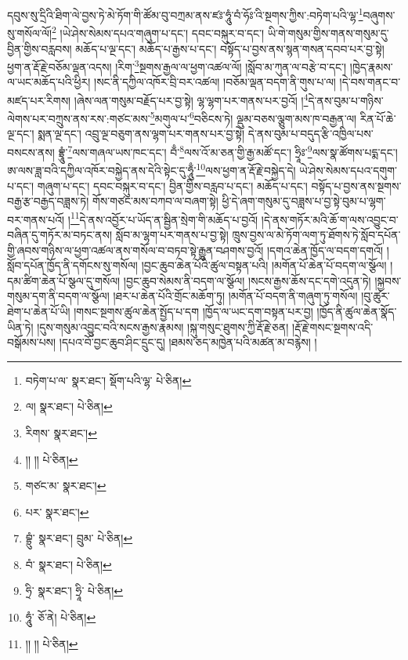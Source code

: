 དབུས་སུ་དྲིའི་ཐིག་ལེ་བྱས་ཏེ་མེ་ཏོག་གི་ཚོམ་བུ་བཀྲམ་ནས་ཛཿ་ཧཱུཾ་བཾ་ཧོཿ་འི་སྔགས་ཀྱིས་:བཏེག་པའི་ལྷ་\footnote{བཏེག་པ་ལ་  སྣར་ཐང་། སྡོག་པའི་ལྷ་  པེ་ཅིན། }བཞུགས་སུ་གསོལ་ལོ།\footnote{ལ།  སྣར་ཐང་།  པེ་ཅིན། } །ཡེ་ཤེས་སེམས་དཔའ་གཞུག་པ་དང་། དབང་བསྐུར་བ་དང་། ཡི་གེ་གསུམ་གྱིས་གནས་གསུམ་དུ་བྱིན་གྱིས་བརླབས། མཆོད་པ་ལྔ་དང་། མཆོད་པ་རྒྱས་པ་དང་། བསྟོད་པ་བྱས་ནས་སྙན་གསན་དབབ་པར་བྱ་སྟེ། ཕྱག་ན་རྡོ་རྗེ་བཅོམ་ལྡན་འདས། །རིག་\footnote{རིགས་  སྣར་ཐང་། }སྔགས་རྒྱལ་ལ་ཕྱག་འཚལ་ལོ། །སློབ་མ་ཀུན་ལ་བརྩེ་བ་དང་། །ཁྱེད་རྣམས་ལ་ཡང་མཆོད་པའི་ཕྱིར། །སང་ནི་དཀྱིལ་འཁོར་བྲི་བར་འཚལ། །བཅོམ་ལྡན་བདག་ནི་གུས་པ་ལ། །དེ་བས་གནང་བ་མཛད་པར་རིགས། །ཞེས་ལན་གསུམ་བརྗོད་པར་བྱ་སྟེ། ལྷ་ལྷག་པར་གནས་པར་བྱའོ། །\footnote{།། །།  པེ་ཅིན། }དེ་ནས་བུམ་པ་གཉིས་ལེགས་པར་བཀྲུས་ནས་རས་:གཙང་མས་\footnote{གཙང་མ་  སྣར་ཐང་། }མགུལ་པ་\footnote{པར་  སྣར་ཐང་། }བཅིངས་ཏེ། ལྡུམ་བཅས་ལྕུག་མས་ཁ་བརྒྱན་ལ། རིན་པོ་ཆེ་ལྔ་དང་། སྨན་ལྔ་དང་། འབྲུ་ལྔ་བཅུག་ནས་ལྷག་པར་གནས་པར་བྱ་སྟེ། དེ་ནས་བུམ་པ་བདུད་རྩི་འཁྱིལ་པས་བསངས་ནས། བྷྲཱུཾ་\footnote{བྷྲུཾ་  སྣར་ཐང་། བྲུམ་  པེ་ཅིན། }ལས་གཞལ་ཡས་ཁང་དང་། བྃ་\footnote{བཾ་  སྣར་ཐང་།  པེ་ཅིན། }ལས་འོ་མ་ཅན་གྱི་རྒྱ་མཚོ་དང་། ཧྲཱིཿ་\footnote{ཧྲི་  སྣར་ཐང་། ཧྲཱི་  པེ་ཅིན། }ལས་སྣ་ཚོགས་པདྨ་དང་། ཨ་ལས་ཟླ་བའི་དཀྱིལ་འཁོར་བསྐྱེད་ནས་དེའི་སྟེང་དུ་ཧཱུྃ་\footnote{ཧཱུཾ་  ཅོ་ནེ།  པེ་ཅིན། }ལས་ཕྱག་ན་རྡོ་རྗེ་བསྐྱེད་དེ། ཡེ་ཤེས་སེམས་དཔའ་དགུག་པ་དང་། གཞུག་པ་དང་། དབང་བསྐུར་བ་དང་། བྱིན་གྱིས་བརླབ་པ་དང་། མཆོད་པ་དང་། བསྟོད་པ་བྱས་ནས་སྔགས་བརྒྱ་རྩ་བརྒྱད་བཟླས་ཏེ། གོས་གཙང་མས་བཀབ་ལ་བཞག་སྟེ། ཕྱི་དེ་ཞག་གསུམ་དུ་བཟླས་པ་བྱ་སྟེ་བུམ་པ་ལྷག་བར་གནས་པའོ། །\footnote{།། །།  པེ་ཅིན། }དེ་ནས་འབྱོར་པ་ཡོད་ན་སྦྱིན་སྲེག་གི་མཆོད་པ་བྱའོ། །དེ་ནས་གཏོར་མའི་ཆོ་ག་ལས་འབྱུང་བ་བཞིན་དུ་གཏོར་མ་བཏང་ནས། སློབ་མ་ལྷག་པར་གནས་པ་བྱ་སྟེ། ཁྲུས་བྱས་ལ་མེ་ཏོག་ལག་ཏུ་ཐོགས་ཏེ་སློབ་དཔོན་གྱི་ཞབས་གཉིས་ལ་ཕྱག་འཚལ་ནས་གསོལ་བ་བཏབ་སྟེ་རྒྱུན་བཤགས་བྱའོ། །དགའ་ཆེན་ཁྱོད་ལ་བདག་དགའོ། །སློབ་དཔོན་ཁྱོད་ནི་དགོངས་སུ་གསོལ། །བྱང་ཆུབ་ཆེན་པོའི་ཚུལ་བསྟན་པའི། །མགོན་པོ་ཆེན་པོ་བདག་ལ་སྩོལ། །དམ་ཚིག་ཆེན་པོ་སྩལ་དུ་གསོལ། །བྱང་ཆུབ་སེམས་ནི་བདག་ལ་སྩོལ། །སངས་རྒྱས་ཆོས་དང་དགེ་འདུན་ཏེ། །སྐྱབས་གསུམ་དག་ནི་བདག་ལ་སྩོལ། །ཐར་པ་ཆེན་པོའི་གྲོང་མཆོག་ཏུ། །མགོན་པོ་བདག་ནི་གཞུག་ཏུ་གསོལ། །བུ་ཚུར་ཐེག་པ་ཆེན་པོ་ཡི། །གསང་སྔགས་ཚུལ་ཆེན་སྤྱོད་པ་དག །ཁྱོད་ལ་ཡང་དག་བསྟན་པར་བྱ། །ཁྱོད་ནི་ཚུལ་ཆེན་སྣོད་ཡིན་ཏེ། །དུས་གསུམ་འབྱུང་བའི་སངས་རྒྱས་རྣམས། །སྐུ་གསུང་ཐུགས་ཀྱི་རྡོ་རྗེ་ཅན། །རྡོ་རྗེ་གསང་སྔགས་འདི་བསྒོམས་པས། །དཔའ་བོ་བྱང་ཆུབ་ཤིང་དྲུང་དུ། །ཐམས་ཅད་མཁྱེན་པའི་མཚན་མ་བརྙེས། །
